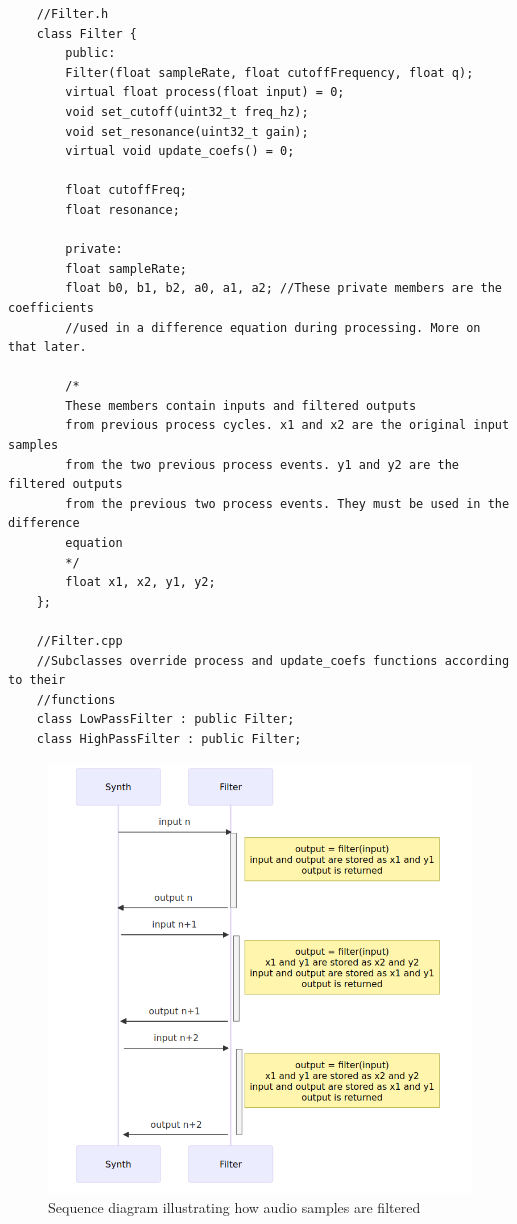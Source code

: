 \documentclass[acmlarge,screen]{acmart}
\begin{document}
	\begin{verbatim}
	//Filter.h
	class Filter {
		public:
		Filter(float sampleRate, float cutoffFrequency, float q);
		virtual float process(float input) = 0;
		void set_cutoff(uint32_t freq_hz);
		void set_resonance(uint32_t gain);
		virtual void update_coefs() = 0;
		
		float cutoffFreq;
		float resonance;
		
		private:
		float sampleRate;
		float b0, b1, b2, a0, a1, a2; //These private members are the coefficients
		//used in a difference equation during processing. More on that later.
		
		/*
		These members contain inputs and filtered outputs
		from previous process cycles. x1 and x2 are the original input samples
		from the two previous process events. y1 and y2 are the filtered outputs
		from the previous two process events. They must be used in the difference
		equation
		*/
		float x1, x2, y1, y2;
	};
	
	//Filter.cpp
	//Subclasses override process and update_coefs functions according to their
	//functions
	class LowPassFilter : public Filter;
	class HighPassFilter : public Filter;
	\end{verbatim}
	

	\begin{figure}
		\centering
		\includegraphics[width=\linewidth]{filter_sequence_diagram}
		\caption{Sequence diagram illustrating how audio samples are filtered}
	\end{figure}
\end{document}
